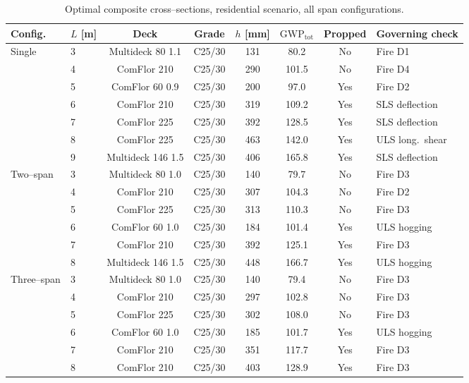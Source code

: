 \begin{table}[h!]
\small\centering
\caption{Optimal composite cross--sections, residential scenario, all span configurations.}
\label{tab:residential_optima}
\begin{tabular}{llcccccl}
\toprule
Config. & $L$ [m] & Deck & Grade & $h$ [mm] & $\mathrm{GWP}_\mathrm{tot}$ & Propped & Governing check \\
\midrule
\multirow{7}{*}{Single}
 & 3 & Multideck 80 1.1  & C25/30 & 131 & 80.2  & No  & Fire D1 \\
 & 4 & ComFlor 210       & C25/30 & 290 & 101.5 & No  & Fire D4 \\
 & 5 & ComFlor 60 0.9    & C25/30 & 200 & 97.0  & Yes & Fire D2 \\
 & 6 & ComFlor 210       & C25/30 & 319 & 109.2 & Yes & SLS deflection \\
 & 7 & ComFlor 225       & C25/30 & 392 & 128.5 & Yes & SLS deflection \\
 & 8 & ComFlor 225       & C25/30 & 463 & 142.0 & Yes & ULS long.\ shear \\
 & 9 & Multideck 146 1.5 & C25/30 & 406 & 165.8 & Yes & SLS deflection \\
\midrule
\multirow{6}{*}{Two--span}
 & 3 & Multideck 80 1.0  & C25/30 & 140 & 79.7  & No  & Fire D3 \\
 & 4 & ComFlor 210       & C25/30 & 307 & 104.3 & No  & Fire D2 \\
 & 5 & ComFlor 225       & C25/30 & 313 & 110.3 & No  & Fire D3 \\
 & 6 & ComFlor 60 1.0    & C25/30 & 184 & 101.4 & Yes & ULS hogging \\
 & 7 & ComFlor 210       & C25/30 & 392 & 125.1 & Yes & Fire D3 \\
 & 8 & Multideck 146 1.5 & C25/30 & 448 & 166.7 & Yes & ULS hogging \\
\midrule
\multirow{6}{*}{Three--span}
 & 3 & Multideck 80 1.0  & C25/30 & 140 & 79.4  & No  & Fire D3 \\
 & 4 & ComFlor 210       & C25/30 & 297 & 102.8 & No  & Fire D3 \\
 & 5 & ComFlor 225       & C25/30 & 302 & 108.0 & No  & Fire D3 \\
 & 6 & ComFlor 60 1.0    & C25/30 & 185 & 101.7 & Yes & ULS hogging \\
 & 7 & ComFlor 210       & C25/30 & 351 & 117.7 & Yes & Fire D3 \\
 & 8 & ComFlor 210       & C25/30 & 403 & 128.9 & Yes & Fire D3 \\
\bottomrule
\end{tabular}
\end{table}

